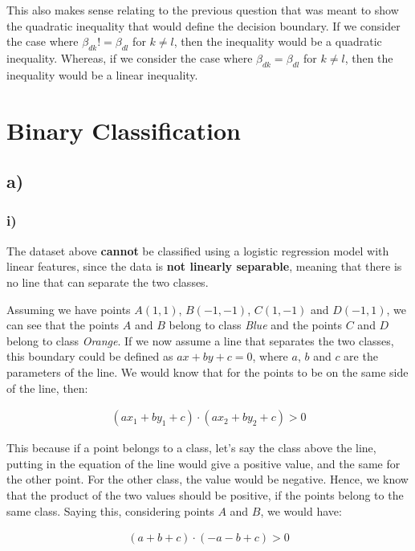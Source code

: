 \documentclass[12pt,a4paper,oneside]{paper}
\begin{document}
This also makes sense relating to the previous question that was meant to show the quadratic inequality that would define the decision boundary.
If we consider the case where $\beta_{dk} != \beta_{dl}$ for $k \neq l$, then the inequality would be a quadratic inequality. 
Whereas, if we consider the case where $\beta_{dk} = \beta_{dl}$ for $k \neq l$, then the inequality would be a linear inequality.


\newpage
\section{Binary Classification}

\subsection*{a)}

\subsubsection*{i)}

The dataset above \textbf{cannot} be classified using a logistic regression model with linear features, since the data is \textbf{not linearly separable}, 
meaning that there is no line that can separate the two classes.

Assuming we have points $A (1, 1)$, $B (-1, -1)$, $C (1, -1)$ and $D (-1, 1)$, we can see that the points $A$ and $B$ belong to class \textit{Blue} and the points $C$ and $D$ belong to class \textit{Orange}.
If we now assume a line that separates the two classes, this boundary could be defined as $ax + by + c = 0$, where $a$, $b$ and $c$ are the parameters of the line.
We would know that for the points to be on the same side of the line, then: 

\begin{align*}
    (ax_1 + by_1 + c) \cdot (ax_2 + by_2 + c) > 0
\end{align*}

This because if a point belongs to a class, let's say the class above the line, putting in the equation of the line would give a positive value, and the same for the other point.
For the other class, the value would be negative. Hence, we know that the product of the two values should be positive, if the points belong to the same class.
Saying this, considering points $A$ and $B$, we would have:

\begin{align*}
    (a + b + c) \cdot (-a - b + c) > 0 \\
\end{align*}
\end{document}
